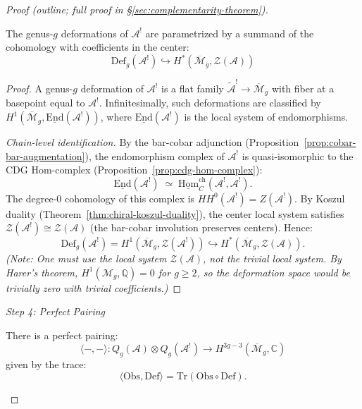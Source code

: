 \begin{proof}[Proof (outline; full proof in \S\textup{\ref{sec:complementarity-theorem}})]
\begin{lemma}\label{lem:deformation-space}
The genus-$g$ deformations of $\mathcal{A}^!$ are parametrized by a summand of the cohomology with coefficients in the center:
\[\mathrm{Def}_g(\mathcal{A}^!) \hookrightarrow H^*(\overline{\mathcal{M}}_g, \mathcal{Z}(\mathcal{A}))\]
\end{lemma}

\begin{proof}
A genus-$g$ deformation of $\mathcal{A}^!$ is a flat family
$\tilde{\mathcal{A}}^! \to \overline{\mathcal{M}}_g$ with fiber at a
basepoint equal to $\mathcal{A}^!$.  Infinitesimally, such deformations
are classified by
$H^1(\overline{\mathcal{M}}_g, \underline{\mathrm{End}}(\mathcal{A}^!))$,
where $\underline{\mathrm{End}}(\mathcal{A}^!)$ is the local system of
endomorphisms.

\emph{Chain-level identification.}
By the bar-cobar adjunction
(Proposition~\ref{prop:cobar-bar-augmentation}), the endomorphism
complex of $\mathcal{A}^!$ is quasi-isomorphic to the CDG Hom-complex
(Proposition~\ref{prop:cdg-hom-complex}):
\[
\underline{\mathrm{End}}(\mathcal{A}^!)
\;\simeq\;
\underline{\mathrm{Hom}}_C^{\mathrm{ch}}(\mathcal{A}^!, \mathcal{A}^!).
\]
The degree-$0$ cohomology of this complex is
$HH^0(\mathcal{A}^!) = Z(\mathcal{A}^!)$.  By Koszul duality
(Theorem~\ref{thm:chiral-koszul-duality}), the center local system
satisfies $\mathcal{Z}(\mathcal{A}^!) \cong \mathcal{Z}(\mathcal{A})$
(the bar-cobar involution preserves centers).  Hence:
\[
\mathrm{Def}_g(\mathcal{A}^!)
= H^1(\overline{\mathcal{M}}_g, \mathcal{Z}(\mathcal{A}^!))
\hookrightarrow H^*(\overline{\mathcal{M}}_g, \mathcal{Z}(\mathcal{A})).
\]
\emph{(Note: One must use the local system $\mathcal{Z}(\mathcal{A})$,
not the trivial local system.  By Harer's theorem,
$H^1(\mathcal{M}_g, \mathbb{Q}) = 0$ for $g \geq 2$, so the
deformation space would be trivially zero with trivial coefficients.)}
\end{proof}

\emph{Step 4: Perfect Pairing}

\begin{lemma}\label{lem:obs-def-pairing}
There is a perfect pairing:
\[\langle -, - \rangle: Q_g(\mathcal{A}) \otimes Q_g(\mathcal{A}^!) \to
H^{3g-3}(\overline{\mathcal{M}}_g, \mathbb{C})\]
given by the trace:
\[\langle \mathrm{Obs}, \mathrm{Def} \rangle = \mathrm{Tr}(\mathrm{Obs} \circ \mathrm{Def}).\]
\end{lemma}


\end{proof}
